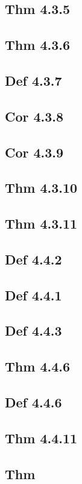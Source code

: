 \subsection*{Thm 4.3.5}

\subsection*{Thm 4.3.6}

\subsection*{Def 4.3.7}

\subsection*{Cor 4.3.8}

\subsection*{Cor 4.3.9}

\subsection*{Thm 4.3.10}

\subsection*{Thm 4.3.11}

\subsection*{Def 4.4.2}

\subsection*{Def 4.4.1}

\subsection*{Def 4.4.3}

\subsection*{Thm 4.4.6}

\subsection*{Def 4.4.6}

\subsection*{Thm 4.4.11}

\subsection*{Thm}


